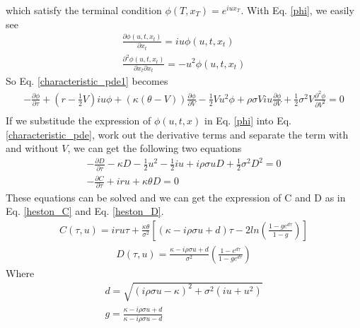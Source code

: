 \documentclass[a4paper]{article}
\begin{document}
which satisfy the terminal condition $\phi(T, x_T) = e^{iux_T}$. With Eq. \ref{phi}, we easily see
\begin{align*}
	\frac{\partial \phi(u, t, x_t)}{\partial x_t} = iu\phi(u, t, x_t) \\
	\frac{\partial^2 \phi(u, t, x_t)}{\partial x_t \partial x_t} = -u^2\phi(u, t, x_t)
\end{align*}
So Eq. \ref{characteristic_pde1} becomes
\begin{align*}	
	-\frac{\partial \phi}{\partial \tau}
	+ (r - \frac{1}{2}V)iu \phi 
	+ (\kappa(\theta-V)) \frac{\partial \phi}{\partial V}
        -\frac{1}{2}Vu^2 \phi
	+ \rho \sigma V iu \frac{\partial \phi}{\partial V}
	+\frac{1}{2} \sigma^2 V \frac{\partial^2 \phi}{\partial V^2}  = 0\\ \label{characteristic_pde}
\end{align*}
If we substitude the expression of $\phi(u, t, x)$ in Eq. \ref{phi} into Eq. \ref{characteristic_pde}, work out the derivative terms and separate the term with and without $V$, we can get the following two equations
\begin{align*}
	-\frac{\partial D}{\partial \tau} - \kappa D - \frac{1}{2}u^2 -\frac{1}{2}iu + i\rho \sigma u D
	+\frac{1}{2} \sigma^2 D^2 = 0 \\
	-\frac{\partial C}{\partial \tau} + iru + \kappa \theta D = 0
\end{align*}
These equations can be solved and we can get the expression of C and D as in Eq. \ref{heston_C} and Eq. \ref{heston_D}.
\begin{align*} 
	C(\tau, u) = iru\tau + \frac{\kappa \theta}{\sigma^2}
	[(\kappa - i\rho \sigma u + d)\tau - 2ln(\frac{1 - g e^{d\tau}}{1 - g})] 
\end{align*}
\begin{align*} 
	D(\tau, u) = \frac{\kappa - i\rho \sigma u + d}{\sigma^2} (\frac{1 - e^{d\tau}}{1-ge^{d\tau}})
\end{align*}
Where
\begin{align*}
	d = \sqrt{(i\rho \sigma u - \kappa)^2 + \sigma^2(i  u  + u^2)} \\
	g = \frac{\kappa - i \rho \sigma u + d}{\kappa - i \rho \sigma u -d} \\
\end{align*}
\end{document}
